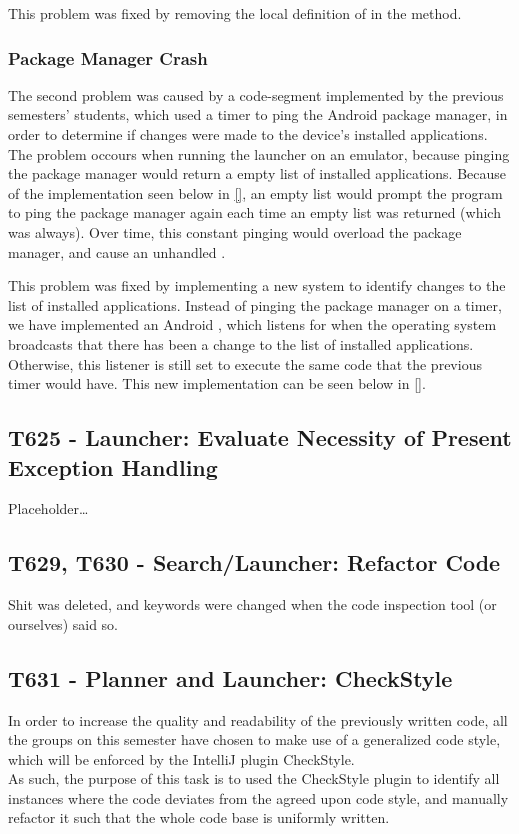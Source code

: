 
This problem was fixed by removing the local definition of 
in the  method.

\subsubsection{Package Manager Crash}
The second problem was caused by a code-segment implemented by the previous
semesters' students, which used a timer to ping the Android package manager, in
order to determine if changes were made to the device's installed applications.
The problem occours when running the launcher on an emulator, because pinging
the package manager would return a empty list of installed applications. Because
of the implementation seen below in \autoref{}, an empty list would prompt
the program to ping the package manager again each time an empty list was
returned (which was always). Over time, this constant pinging would overload
the package manager, and cause an unhandled .\nl

\nl

This problem was fixed by implementing a new system to identify changes to the
list of installed applications. Instead of pinging the package manager on a
timer, we have implemented an Android , which listens
for when the operating system broadcasts that there has been a change to the
list of installed applications. Otherwise, this listener is still set to
execute the same code that the previous timer would have. This new
implementation can be seen below in \autoref{}.\nl


\subsection{T625 - Launcher: Evaluate Necessity of Present Exception Handling}
Placeholder\ldots

\subsection{T629, T630 - Search/Launcher: Refactor Code}
Shit was deleted, and keywords were changed when the code inspection tool (or
ourselves) said so.

\subsection{T631 - Planner and Launcher: CheckStyle}
In order to increase the quality and readability of the previously written code,
all the groups on this semester have chosen to make use of a generalized code
style, which will be enforced by the IntelliJ plugin CheckStyle.\\
As such, the purpose of this task is to used the CheckStyle plugin to identify
all instances where the code deviates from the agreed upon code style, and
manually refactor it such that the whole code base is uniformly written.\nl

